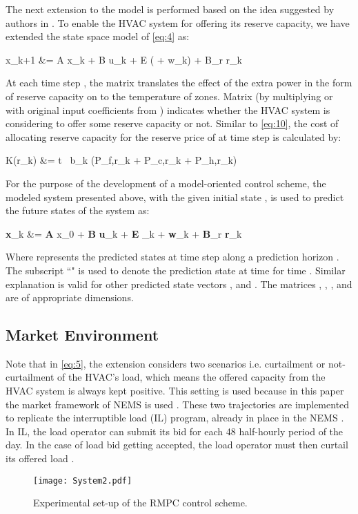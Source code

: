 \documentclass[conference,10pt]{IEEEtran}
\begin{document}
The next extension to the model is performed based on the idea suggested by authors in \cite{Vrettosb}. To enable the HVAC system for offering its reserve capacity, we have extended the state space model of \eqref{eq:4} as:

x_{k+1} &= A x_{k} + B u_{k} + E ( + w_k) + B_{r} r_{k}



At each time step , the matrix  translates the effect of the extra power in the form of reserve capacity  on to the temperature of zones. Matrix   (by multiplying  or  with original input coefficients from ) indicates whether the HVAC system is considering to offer some reserve capacity or not. Similar to \eqref{eq:10}, the cost  of allocating reserve capacity  for the reserve price of  at time step  is calculated by:

K\left(r_k\right)  &= \Delta t \ b_k \left(P_{f,r_k} + P_{c,r_k} + P_{h,r_k}\right)
 


For the purpose of the development of a model-oriented control scheme, the modeled system presented above, with the given initial state , is used to predict the future states of the system as:

\textbf{x}_k  &= \textbf{A} x_{0} + \textbf{B} \textbf{u}_k + \textbf{E} _{k} + \textbf{w}_{k} + \textbf{B}_{r} \textbf{r}_{k}



Where  represents the predicted states at time step  along a prediction horizon . The subscript ``" is used to denote the prediction state at time  for time . Similar explanation is valid for other predicted state vectors ,  and . The matrices , , , and  are of appropriate dimensions.
\subsection{Market Environment}\label{subsec:1_3}
Note that in \eqref{eq:5}, the extension considers two scenarios i.e. curtailment or not-curtailment of the HVAC's load, which means the offered capacity from the HVAC system is always kept positive. This setting is used because in this paper the market framework of NEMS is used \cite{NEMS}. These two trajectories are implemented to replicate the interruptible load (IL) program, already in place in the NEMS \cite{NEMS}. In IL, the load operator can submit its bid for each 48 half-hourly period of the day. In the case of load bid getting accepted, the load operator must then curtail its offered load \cite{EMAIL}.
\begin{figure}
	\centering
  \texttt{[image: System2.pdf]}
  \caption{Experimental set-up of the RMPC control scheme.}
\label{fig1}
\end{figure}
\end{document}
